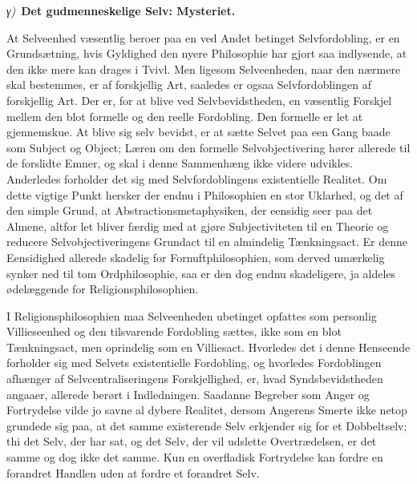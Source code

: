 \documentclass[12pt]{book}
\newcommand{\greekrun}[2]{%
  \medskip\begin{center}{\itshape #1)}\ {\bfseries #2}\end{center}\medskip}
\begin{document}
\greekrun{γ}{Det gudmenneskelige Selv: Mysteriet.}

At Selveenhed væsentlig beroer paa en ved Andet betinget
Selvfordobling, er en Grundsætning, hvis Gyldighed den nyere
Philosophie har gjort saa indlysende, at den ikke mere kan drages i
Tvivl. Men ligesom Selveenheden, naar den nærmere skal bestemmes, er
af forskjellig Art, saaledes er ogsaa Selvfordoblingen af forskjellig
Art. Der er, for at blive ved Selvbevidstheden, en væsentlig Forskjel
mellem den blot formelle og den reelle Fordobling. Den formelle er
let at gjennemskue. At blive sig selv bevidst, er at sætte Selvet paa
een Gang baade som Subject og Object; Læren om den formelle
Selvobjectivering hører allerede til de forslidte Emner, og skal i
denne Sammenhæng ikke videre udvikles. Anderledes forholder det sig
med Selvfordoblingens existentielle Realitet. Om dette vigtige Punkt
hersker der endnu i Philosophien en stor Uklarhed, og det af den
simple Grund, at Abstractionsmetaphysiken, der eensidig seer paa det
Almene, altfor let bliver færdig med at gjøre Subjectiviteten til en
Theorie og reducere Selvobjectiveringens Grundact til en almindelig
Tænkningsact. Er denne Eensidighed allerede skadelig for
Fornuftphilosophien, som derved umærkelig synker ned til tom
Ordphilosophie, saa er den dog endnu skadeligere, ja aldeles
ødelæggende for Religionsphilosophien.

I Religionsphilosophien maa Selveenheden ubetinget opfattes som
personlig Villieseenhed og den tilsvarende Fordobling sættes, ikke
som en blot Tænkningsact, men oprindelig som en Villiesact. Hvorledes
det i denne Henseende forholder sig med Selvets existentielle
Fordobling,
og hvorledes Fordoblingen afhænger af Selvcentraliseringens
Forskjellighed, er, hvad Syndsbevidstheden angaaer, allerede berørt i
Indledningen. Saadanne Begreber som Anger og Fortrydelse vilde jo
savne al dybere Realitet, dersom Angerens Smerte ikke netop grundede
sig paa, at det samme existerende Selv erkjender sig for et
Dobbeltselv; thi det Selv, der har sat, og det Selv, der vil udslette
Overtrædelsen, er det samme og dog ikke det samme. Kun en overfladisk
Fortrydelse kan fordre en forandret Handlen uden at fordre et
forandret Selv.
\end{document}
